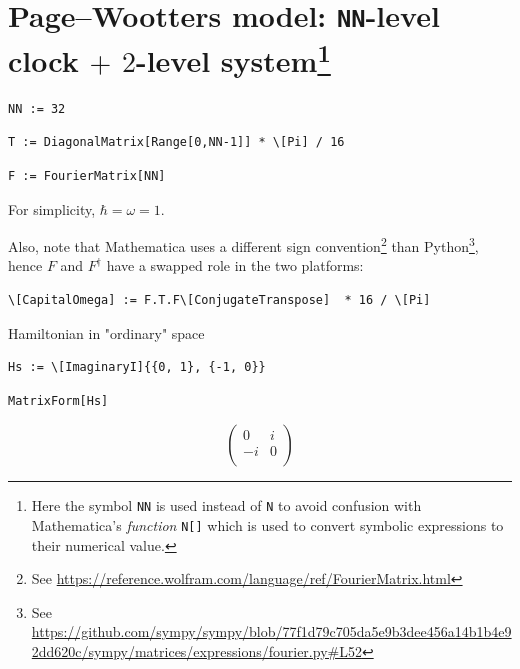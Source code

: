 \section[
  \texttt{NN}-level clock $+$ $2$-level system
]{%
  Page--Wootters model: \texttt{NN}-level clock $+$ $2$-level system\footnote{
    Here the symbol \texttt{NN} is used instead of \texttt{N} to avoid confusion with
    Mathematica's \emph{function} \texttt{N[]} which
    is used to convert symbolic expressions to their numerical value.
  }
}
\label{appendix:n-level}


\begin{Verbatim}
NN := 32
\end{Verbatim}

\begin{Verbatim}
T := DiagonalMatrix[Range[0,NN-1]] * \[Pi] / 16
\end{Verbatim}

\begin{Verbatim}
F := FourierMatrix[NN]
\end{Verbatim}

For simplicity, $\hbar = \omega = 1$.

Also, note that Mathematica uses a different sign convention\footnote{
  See \url{https://reference.wolfram.com/language/ref/FourierMatrix.html}
}
than Python\footnote{
  See \url{https://github.com/sympy/sympy/blob/77f1d79c705da5e9b3dee456a14b1b4e92dd620c/sympy/matrices/expressions/fourier.py\#L52}
}, hence $F$ and $F^{\dagger}$ have a swapped role in the two platforms:

\begin{Verbatim}
\[CapitalOmega] := F.T.F\[ConjugateTranspose]  * 16 / \[Pi]
\end{Verbatim}

Hamiltonian in "ordinary" space
\begin{Verbatim}
Hs := \[ImaginaryI]{{0, 1}, {-1, 0}}
\end{Verbatim}
\begin{Verbatim}
MatrixForm[Hs]
\end{Verbatim}
\[
  \left(
    \begin{array}{cc}
     0 & i \\
     -i & 0 \\
    \end{array}
    \right)
\]

